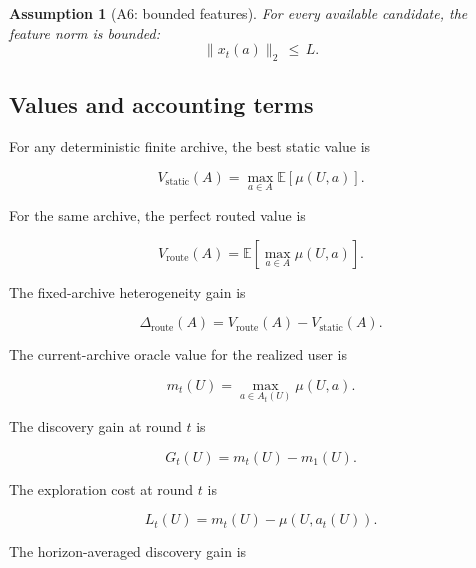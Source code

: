 \documentclass{article} %
\newtheorem{assumption}{Assumption}
\begin{document}
\begin{assumption}[A6: bounded features]
\label{ass:app-features}
For every available candidate, the feature norm is bounded:
\begin{equation}
\label{eq:app-ass-feature-bound}
\|x_t(a)\|_2 \,\le\, L.
\end{equation}
\end{assumption}

\subsection{Values and accounting terms}

For any deterministic finite archive, the best static value is

\begin{equation}
\label{eq:app-vstatic}
V_{\mathrm{static}}(A)
=
\max_{a\in A}\mathbb{E}[\mu(U,a)].
\end{equation}

For the same archive, the perfect routed value is

\begin{equation}
\label{eq:app-vroute}
V_{\mathrm{route}}(A)
=
\mathbb{E}\!\left[\max_{a\in A}\mu(U,a)\right].
\end{equation}

The fixed-archive heterogeneity gain is

\begin{equation}
\label{eq:app-delta-het}
\Delta_{\mathrm{route}}(A)
=
V_{\mathrm{route}}(A)-V_{\mathrm{static}}(A).
\end{equation}

The current-archive oracle value for the realized user is

\begin{equation}
\label{eq:app-mt}
m_t(U)
=
\max_{a\in A_t(U)} \mu(U,a).
\end{equation}

The discovery gain at round \(t\) is

\begin{equation}
\label{eq:app-gt}
G_t(U)
=
m_t(U)-m_1(U).
\end{equation}

The exploration cost at round \(t\) is

\begin{equation}
\label{eq:app-lt}
L_t(U)
=
m_t(U)-\mu(U,a_t(U)).
\end{equation}

The horizon-averaged discovery gain is
\end{document}
